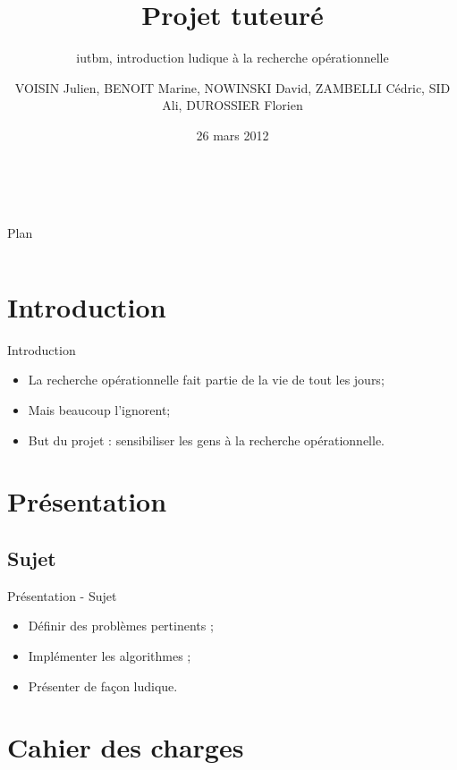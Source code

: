 \documentclass{beamer}
\title[Projet tuteuré]{Projet tuteuré}
\subtitle[Projet Tuteuré]{iutbm, introduction ludique à la recherche opérationnelle}
\author[]{VOISIN Julien, BENOIT Marine, NOWINSKI David, ZAMBELLI Cédric, SID Ali, DUROSSIER Florien}
\institute{IUT informatique Belfort}
\date{26 mars 2012}
\begin{document}
\begin{frame}{~}
	\titlepage
\end{frame}

%
%

\begin{frame}{Plan}
	\begin{columns}[t]
		\begin{column}{5cm}
			\tableofcontents[sections={1-5}, hideothersubsections]
		\end{column}
		\begin{column}{5cm}
			\tableofcontents[sections={6-9}, hideothersubsections]
		\end{column}
	\end{columns}
\end{frame}

\section{Introduction}
	\begin{frame}{Introduction}
		\begin{itemize}
			\setlength{\itemsep}{0.5cm}
			\item La recherche opérationnelle fait partie de la vie de tout les jours;
			\pause
			\item Mais beaucoup l'ignorent;
			\pause
			\item But du projet : sensibiliser les gens à la recherche
			    opérationnelle.
		\end{itemize}
	\end{frame}

\section{Présentation}
	\subsection{Sujet}
		\begin{frame}{Présentation - Sujet}
			\begin{itemize}
				\setlength{\itemsep}{1cm}
				\item Définir des problèmes pertinents ;
				\item Implémenter les algorithmes ;
				\item Présenter de façon ludique.
			\end{itemize}
		\end{frame}
\section{Cahier des charges}
\end{document}
